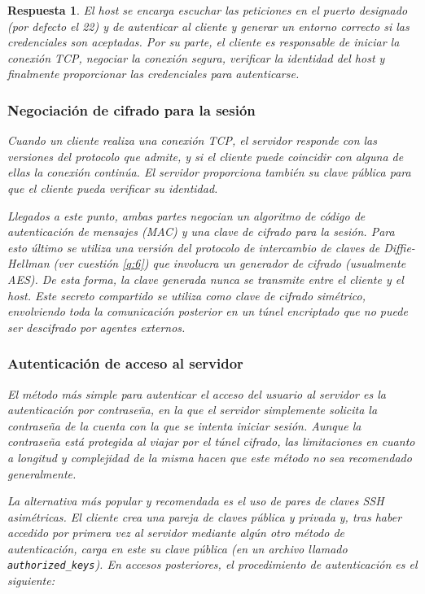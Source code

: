 \documentclass[
  a4paper,
  spanish,
  12pt,
]{scrartcl}
\theoremstyle{ejercicio-style}
\theoremstyle{remark-style}
\newtheorem*{sol}{Respuesta}
\theoremstyle{teorema-style}
\begin{document}
\begin{sol}
  El \textit{host} se encarga escuchar las peticiones en el puerto designado (por defecto el 22) y de autenticar al cliente y generar un entorno correcto si las credenciales son aceptadas. Por su parte, el cliente es responsable de iniciar la conexión TCP, negociar la conexión segura, verificar la identidad del host y finalmente proporcionar las credenciales para autenticarse.

  \subsubsection*{Negociación de cifrado para la sesión}

  Cuando un cliente realiza una conexión TCP, el servidor responde con las versiones del protocolo que admite, y si el cliente puede coincidir con alguna de ellas la conexión continúa. El servidor proporciona también su clave pública para que el cliente pueda verificar su identidad.

  Llegados a este punto, ambas partes negocian un algoritmo de código de autenticación de mensajes (MAC) y una clave de cifrado para la sesión. Para esto último se utiliza una versión del protocolo de intercambio de claves de Diffie-Hellman (ver cuestión \ref{q:6}) que involucra un generador de cifrado (usualmente AES). De esta forma, la clave generada nunca se transmite entre el cliente y el \textit{host}. Este secreto compartido se utiliza como clave de cifrado simétrico, envolviendo toda la comunicación posterior en un túnel encriptado que no puede ser descifrado por agentes externos.

  \subsubsection*{Autenticación de acceso al servidor}

  El método más simple para autenticar el acceso del usuario al servidor es la autenticación por contraseña, en la que el servidor simplemente solicita la contraseña de la cuenta con la que se intenta iniciar sesión. Aunque la contraseña está protegida al viajar por el túnel cifrado, las limitaciones en cuanto a longitud y complejidad de la misma hacen que este método no sea recomendado generalmente.

  La alternativa más popular y recomendada es el uso de pares de claves SSH asimétricas. El cliente crea una pareja de claves pública y privada y, tras haber accedido por primera vez al servidor mediante algún otro método de autenticación, carga en este su clave pública (en un archivo llamado \verb|authorized_keys|). En accesos posteriores, el procedimiento de autenticación es el siguiente:


\end{sol}
\end{document}
